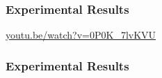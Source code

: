 \begin{frame}
    \frametitle{Experimental Results}
    \centering
    \LARGE
    \textcolor{blue}{\url{youtu.be/watch?v=0P0K\_7lvKVU}}
\end{frame}


\begin{frame}
    \frametitle{Experimental Results}
    \begin{figure}[h]
        \centering
        \resizebox{0.85\textwidth}{!}{}
    \end{figure}
\end{frame}
